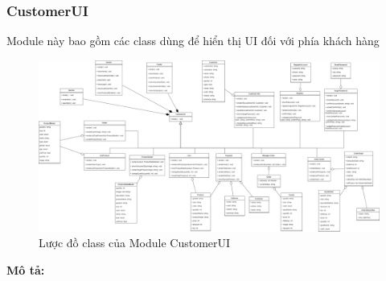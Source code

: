 \subsubsection{CustomerUI}
Module này bao gồm các class dùng để hiển thị UI đối với phía khách hàng
\begin{figure}[!htp]
	\centering
	\includegraphics[width=17cm]{img/Architecture/UI/customer UI.png}
	\newline
	\caption{Lược đồ class của Module CustomerUI}
\end{figure}
\textbf{Mô tả:}
